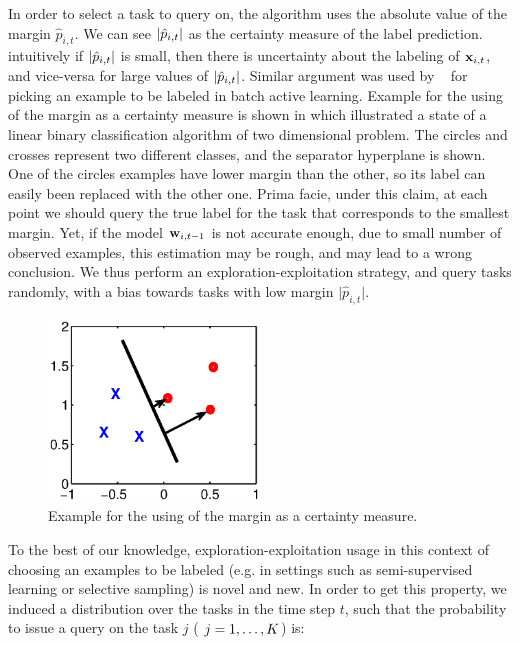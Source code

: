 In order to select a task to query on, the algorithm uses the absolute value of the margin 
$\hat{p}_{i,t}$. We can see $\left\vert{\hat{p}_{i,t}}\right\vert$ as the certainty measure of the label prediction.
 intuitively if $\left\vert{\hat{p}_{i,t}}\right\vert$ is small,
then there is uncertainty about the labeling of $\mathbf{x}_{i,t}$, and vice-versa for 
large values of $\left\vert{\hat{p}_{i,t}}\right\vert$. 
Similar argument was used by ~\cite{DBLP:conf/icml/TongK00} for picking an example to be labeled in 
batch active learning. 
Example for the using of the margin as a certainty measure is shown in  which illustrated 
a state of a linear binary classification algorithm of two dimensional problem. 
The circles and crosses represent two different classes, and the separator hyperplane is shown. 
One of the circles examples have lower margin than the other, so its label can easily been replaced 
with the other one.
Prima facie, under this claim, at each point we should query the true label for the task
 that corresponds to the smallest margin.  Yet, if the model $\mathbf{w}_{i,t-1}$ is not accurate enough, due to
 small number of observed examples, this estimation may be rough, and may lead to a wrong
conclusion. We thus perform an exploration-exploitation strategy, and
query tasks randomly, with a bias towards tasks with low margin
$\vert \hat{p}_{i,t} \vert$. 

\begin{figure}[h]
\begin{centering}
\includegraphics[width=0.5\textwidth]{figs/margin.eps}
\caption{Example for the using of the margin as a certainty measure.}
\label{fig:margin}
\end{centering}
\end{figure}


To the best of our knowledge,
exploration-exploitation usage in this context of choosing an examples
to be labeled (e.g. in settings such as semi-supervised learning or
selective sampling) is novel and new.  In order to get this property, we induced a
distribution over the tasks in the time step $t$, such that the probability to issue a query on the task 
$j$ ( $j=1 , \ldots , K$) is:

